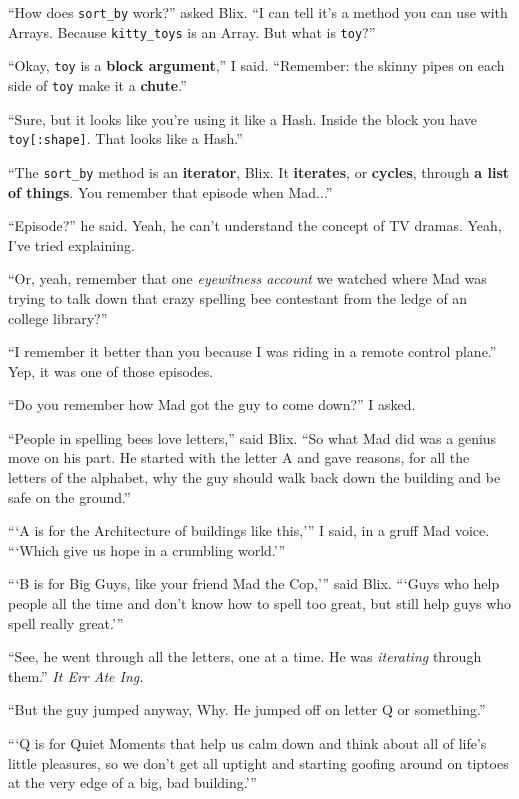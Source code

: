 \documentclass[10pt,twoside]{report}
\begin{document}
``How does \lstinline[breaklines=true]|sort_by| work?'' asked Blix.
``I can tell it's a method you can use with Arrays.  Because
\lstinline[breaklines=true]|kitty_toys| is an Array.  But what is
\lstinline[breaklines=true]|toy|?''

``Okay, \lstinline[breaklines=true]|toy| is a {\bf block argument},''
I said.  ``Remember: the skinny pipes on each side of
\lstinline[breaklines=true]|toy| make it a {\bf chute}.''

``Sure, but it looks like you're using it like a Hash.  Inside the
block you have \lstinline[breaklines=true]|toy[:shape]|. That looks
like a Hash.''

``The \lstinline[breaklines=true]|sort_by| method is an {\bf
  iterator}, Blix.  It {\bf iterates}, or {\bf cycles}, through {\bf a
  list of things}.  You remember that episode when Mad...''

``Episode?'' he said.  Yeah, he can't understand the concept of TV
dramas.  Yeah, I've tried explaining.

``Or, yeah, remember that one {\em eyewitness account} we watched
where Mad was trying to talk down that crazy spelling bee contestant
from the ledge of an college library?''

``I remember it better than you because I was riding in a remote
control plane.''  Yep, it was one of those episodes.

``Do you remember how Mad got the guy to come down?'' I asked.

``People in spelling bees love letters,'' said Blix.  ``So what Mad
did was a genius move on his part. He started with the letter A and
gave reasons, for all the letters of the alphabet, why the guy should
walk back down the building and be safe on the ground.''

```A is for the Architecture of buildings like this,''' I said, in a
gruff Mad voice. ```Which give us hope in a crumbling world.'''

```B is for Big Guys, like your friend Mad the Cop,''' said Blix.
```Guys who help people all the time and don't know how to spell too
great, but still help guys who spell really great.'''

``See, he went through all the letters, one at a time.  He was {\em
  iterating} through them.'' {\em It Err Ate Ing.}

``But the guy jumped anyway, Why.  He jumped off on letter Q or
something.''

```Q is for Quiet Moments that help us calm down and think about all
of life's little pleasures, so we don't get all uptight and starting
goofing around on tiptoes at the very edge of a big, bad building.'''
\end{document}
